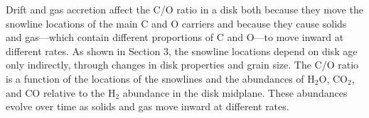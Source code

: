 \documentclass[apj]{emulateapj}
\begin{document}


Drift and gas accretion affect the C/O ratio in a disk both because they move the snowline locations of the main C and O carriers  and because they cause solids and gas---which contain different proportions of C and O---to move inward at different rates.  As shown in Section 3, the snowline locations depend on disk age only indirectly, through changes in disk properties and grain size.  The C/O ratio is a function of the locations of the snowlines and the abundances of H$_2$O, CO$_2$, and CO relative to the H$_2$ abundance in the disk midplane.   These abundances evolve over time as solids and gas move inward at different rates.
\end{document}
